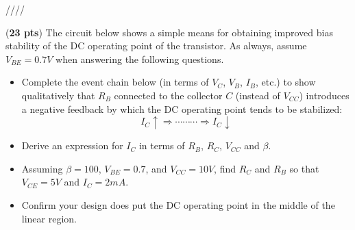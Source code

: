 \begin{enumerate}

  \begin{comment}
  {\bf Solution:} 
  The phasor form of the input voltage is:
  \[ \dot{V}_s=70/\sqrt{2}\angle 36.9^\circ =49.49\angle 36.9^\circ \]
  Find $i_L(t)$:
  \[ \dot{I}_L=\frac{\dot{V_s}}{R_1+R_2+j(\omega L-1/\omega C)}
  =\frac{49.49\angle 36.9^\circ}{150+50+j(200-200)}=0.247\angle 36.9^\circ \]
  \[ i_L(t)=0.35\;\sin(\omega t+36.9^\circ)\;\;\;\;\;(t<0) \]
  \[ i_L(0_-)=0.35\;\sin(36.9^\circ)=0.21\;A \]
  \[ \dot{V}_C=Z_C \dot{I}=\dot{I}/j\omega C =49.49\angle -53.1^\circ \]
  \[ v_C(0_-)=70\;sin(-53.1^\circ)=-55.98\;V \]

  For $t>0$, the switch is closed, $\tau_C=R_2C=2.5\times 10^{-4}$, 
  $1/\tau_1=4000$, $\tau_L=L/R_1=1.33\times 10^{-3}$, $1/\tau_L=750$.
  As the steady state of $v_C(t)$ is zero, we can find $v_C(t)$ to be
  \[ v_C(t)=-55.98\;e^{-4000  t} \]
  Find steady state of $i_L(t)$:
  \[ \dot{I}_L=\frac{\dot{V}_s}{R_1+j\omega L}=\frac{49.49\angle 36.9}{150+j200}
  =0.2\angle -16.23 \]
  the steady state of $i_L(t)$ is
  \[ i_L(t)=0.2\sqrt{2}\sin(\omega t-16.23^\circ)=0.283\sin(\omega t-16.23^\circ) \]
  Evaluating $i_L(t)$ at $t=0$ we get:
  \[ i_L(0)=0.283\sin(-16.23^\circ)=-0.08 \]
  The complete $i_L(t)$ is
  \[ i_L(t)=0.283\sin(\omega t-16.23^\circ)+[0.21-(-0.08)]e^{-t/\tau_L}
  =0.283\sin(\omega t-16.23^\circ)+0.29\;e^{-750\;t} \]

  \end{comment}



\end{enumerate}


////


\item ({\bf 23 pts})
  The circuit below shows a simple means for obtaining improved bias
  stability of the DC operating point of the transistor. As always,
  assume $V_{BE}=0.7V$ when answering the following questions.


  \begin{itemize}
  \item Complete the event chain below (in terms of $V_C$, $V_B$, $I_B$,
    etc.) to show qualitatively that $R_B$ connected to the collector $C$ 
    (instead of $V_{CC}$) introduces a negative feedback by which the DC
    operating point tends to be stabilized:
    \[
    I_C \uparrow \Longrightarrow \cdots\cdots\cdots \Longrightarrow I_C \downarrow     
    \]
  \item Derive an expression for $I_C$ in terms of $R_B$, $R_C$, $V_{CC}$
    and $\beta$.
  \item Assuming $\beta=100$, $V_{BE}=0.7$, and $V_{CC}=10V$, find $R_C$ 
    and $R_B$ so that $V_{CE}=5V$ and $I_C=2mA$.
  \item Confirm your design does put the DC operating point in the middle
    of the linear region.
  \end{itemize}


